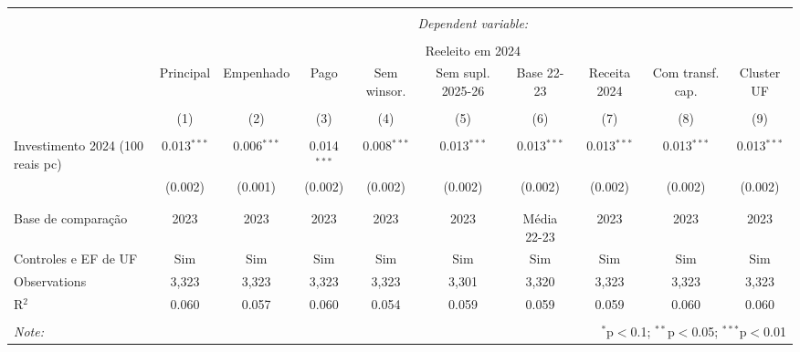 
\begin{table}[!htbp] \centering 
  \caption{} 
  \label{} 
\begin{tabular}{@{\extracolsep{5pt}}lccccccccc} 
\\[-1.8ex]\hline 
\hline \\[-1.8ex] 
 & \multicolumn{9}{c}{\textit{Dependent variable:}} \\ 
\cline{2-10} 
\\[-1.8ex] & \multicolumn{9}{c}{Reeleito em 2024} \\ 
 & Principal & Empenhado & Pago & Sem winsor. & Sem supl. 2025-26 & Base 22-23 & Receita 2024 & Com transf. cap. & Cluster UF \\ 
\\[-1.8ex] & (1) & (2) & (3) & (4) & (5) & (6) & (7) & (8) & (9)\\ 
\hline \\[-1.8ex] 
 Investimento 2024 (100 reais pc) & 0.013$^{***}$ & 0.006$^{***}$ & 0.014$^{***}$ & 0.008$^{***}$ & 0.013$^{***}$ & 0.013$^{***}$ & 0.013$^{***}$ & 0.013$^{***}$ & 0.013$^{***}$ \\ 
  & (0.002) & (0.001) & (0.002) & (0.002) & (0.002) & (0.002) & (0.002) & (0.002) & (0.002) \\ 
  & & & & & & & & & \\ 
\hline \\[-1.8ex] 
Base de comparação & 2023 & 2023 & 2023 & 2023 & 2023 & Média 22-23 & 2023 & 2023 & 2023 \\ 
Controles e EF de UF & Sim & Sim & Sim & Sim & Sim & Sim & Sim & Sim & Sim \\ 
Observations & 3,323 & 3,323 & 3,323 & 3,323 & 3,301 & 3,320 & 3,323 & 3,323 & 3,323 \\ 
R$^{2}$ & 0.060 & 0.057 & 0.060 & 0.054 & 0.059 & 0.059 & 0.059 & 0.060 & 0.060 \\ 
\hline 
\hline \\[-1.8ex] 
\textit{Note:}  & \multicolumn{9}{r}{$^{*}$p$<$0.1; $^{**}$p$<$0.05; $^{***}$p$<$0.01} \\ 
\end{tabular} 
\end{table} 
